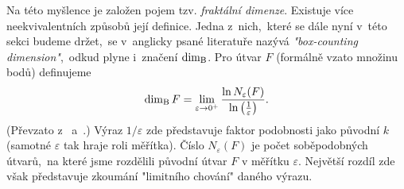 Na této myšlence je založen pojem tzv. \emph{fraktální dimenze}. Existuje více neekvivalentních způsobů její definice. Jedna z~nich,~které se dále nyní v~této sekci budeme držet,~se v~anglicky psané literatuře nazývá \emph{"box-counting dimension"},~odkud plyne i~značení $\operatorname{dim_B}$. Pro útvar $F$ (formálně vzato množinu bodů) definujeme 
\begin{equation}\label{eq:fraktalni-dimenze}
    \operatorname{dim_B}{F}=\lim_{\varepsilon\to 0^+}{\dfrac{\ln{N_\varepsilon(F)}}{\ln{\left(\frac{1}{\varepsilon}\right)}}}.
\end{equation}
(Převzato z~\cite[str. 93]{Zelinka2006} a~\cite[str. 28]{Falconer2014}.) Výraz $1/\varepsilon$ zde představuje faktor podobnosti jako původní $k$ (samotné $\varepsilon$ tak hraje roli měřítka). Číslo $N_\varepsilon(F)$ je počet soběpodobných útvarů,~na které jsme rozdělili původní útvar $F$ v měřítku $\varepsilon$. Největší rozdíl zde však představuje zkoumání "limitního chování" daného výrazu.

